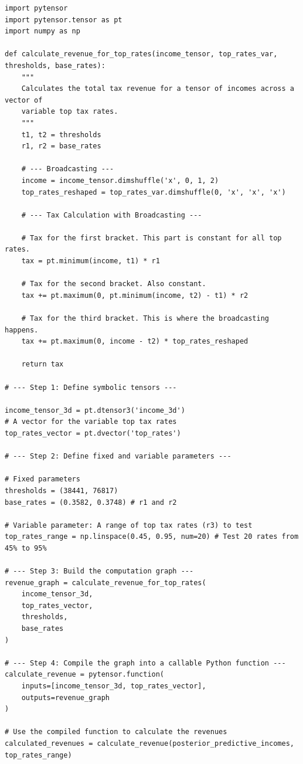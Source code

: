 \documentclass[11pt]{article}
\begin{document}
\begin{verbatim}
import pytensor
import pytensor.tensor as pt
import numpy as np

def calculate_revenue_for_top_rates(income_tensor, top_rates_var, thresholds, base_rates):
    """
    Calculates the total tax revenue for a tensor of incomes across a vector of
    variable top tax rates.
    """
    t1, t2 = thresholds
    r1, r2 = base_rates

    # --- Broadcasting ---
    income = income_tensor.dimshuffle('x', 0, 1, 2)
    top_rates_reshaped = top_rates_var.dimshuffle(0, 'x', 'x', 'x')

    # --- Tax Calculation with Broadcasting ---

    # Tax for the first bracket. This part is constant for all top rates.
    tax = pt.minimum(income, t1) * r1

    # Tax for the second bracket. Also constant.
    tax += pt.maximum(0, pt.minimum(income, t2) - t1) * r2

    # Tax for the third bracket. This is where the broadcasting happens.
    tax += pt.maximum(0, income - t2) * top_rates_reshaped

    return tax

# --- Step 1: Define symbolic tensors ---

income_tensor_3d = pt.dtensor3('income_3d')
# A vector for the variable top tax rates
top_rates_vector = pt.dvector('top_rates')

# --- Step 2: Define fixed and variable parameters ---

# Fixed parameters
thresholds = (38441, 76817)
base_rates = (0.3582, 0.3748) # r1 and r2

# Variable parameter: A range of top tax rates (r3) to test
top_rates_range = np.linspace(0.45, 0.95, num=20) # Test 20 rates from 45% to 95%

# --- Step 3: Build the computation graph ---
revenue_graph = calculate_revenue_for_top_rates(
    income_tensor_3d,
    top_rates_vector,
    thresholds,
    base_rates
)

# --- Step 4: Compile the graph into a callable Python function ---
calculate_revenue = pytensor.function(
    inputs=[income_tensor_3d, top_rates_vector],
    outputs=revenue_graph
)

# Use the compiled function to calculate the revenues
calculated_revenues = calculate_revenue(posterior_predictive_incomes, top_rates_range)

\end{verbatim}
\end{document}
